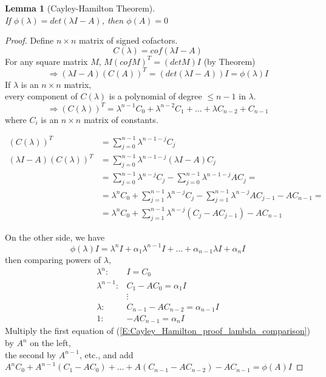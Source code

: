 \documentclass[twoside]{amsart}
\theoremstyle{plain}
\newtheorem{lemma}{Lemma}
\theoremstyle{definition}
\begin{document}
\begin{lemma}[Cayley-Hamilton Theorem]\label{L:Cayley-Hamilton_Theorem} \quad \\
  If $\phi(\lambda) = det(\lambda I - A) $, then $\phi(A) = 0$
\end{lemma}
\begin{proof}
  Define $n \times n$ matrix of signed cofactors.  
  \[
C(\lambda) = cof(\lambda I -A)
  \]
  For any square matrix $M$, $M (cof M)^T = (det M) I$ (by Theorem) 
\[
\Longrightarrow (\lambda I - A)(C(A))^T = (det(\lambda I - A))I = \phi(\lambda) I
\]
If $\lambda$ is an $n \times n $ matrix, \\
\phantom{If} every component of $C(\lambda)$ is a polynomial of degree $\leq n-1$ in $\lambda$.  
\[
\Longrightarrow (C(\lambda))^T = \lambda^{n-1}C_0 + \lambda^{n-2} C_1 + \dots + \lambda C_{n-2} + C_{n-1}
\]
where $C_i$ is an $n \times n $ matrix of constants.

\footnotesize{ 
  \[ 
  \begin{aligned}
    (C(\lambda))^T & = \sum_{j=0}^{n-1} \lambda^{n-1-j} C_j \\
    (\lambda I - A)(C(\lambda))^T & = \sum_{j=0}^{n-1} \lambda^{n-1-j} (\lambda I -A)C_j \\
    & = \sum_{j=0}^{n-1} \lambda^{n-j} C_j - \sum_{j=0}^{n-1} \lambda^{n-1-j} AC_j = \\
    & = \lambda^n C_0 + \sum_{j=1}^{n-1} \lambda^{n-j} C_j - \sum_{j=1}^{n-1} \lambda^{n-j} A C_{j-1} - A C_{n-1} = \\
    & = \lambda^n C_0 + \sum_{j=1}^{n-1} \lambda^{n-j} (C_j-AC_{j-1}) - AC_{n-1}
  \end{aligned}
  \]}
\normalsize

On the other side, we have
\[
\phi(\lambda) I = \lambda^n I + \alpha_1 \lambda^{n-1} I + \dots + \alpha_{n-1} \lambda I + \alpha_n I
\]
\phantom{On th} then comparing powers of $\lambda$, 
\begin{equation}\label{E:Cayley_Hamilton_proof_lambda_comparison}
\begin{aligned}
  \lambda^n : & I = C_0 \\
  \lambda^{n-1} : & C_1 - A C_0 = \alpha_1 I \\
  & \vdots \\
  \lambda : & C_{n-1} - A C_{n-2} = \alpha_{n-1} I \\
  1 : & -AC_{n-1} = \alpha_n I
\end{aligned}
\end{equation}
Multiply the first equation of (\ref{E:Cayley_Hamilton_proof_lambda_comparison}) by $A^n$ on the left, \\
\phantom{Multip} the second by $A^{n-1}$, etc., and add \\
\phantom{Mul} $A^n C_0 + A^{n-1}(C_1 - AC_0) + \dots + A(C_{n-1}-AC_{n-2} )  - AC_{n-1} = \phi(A) I $


\end{proof}
\end{document}
